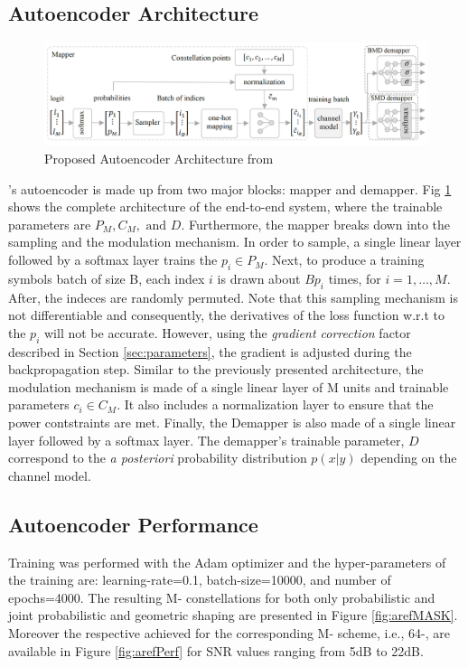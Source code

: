 \subsection{Autoencoder Architecture}
\begin{figure}[H]
	\centering
	\includegraphics[width=\textwidth]{figs/aref_diagram.png}
	\caption{Proposed Autoencoder Architecture from \cite{Aref}}
	\label{fig:arefAe}
\end{figure}

\citeauthor{Aref}'s autoencoder is made up from two major blocks: mapper and demapper. Fig \ref{fig:arefAe} shows the complete architecture of the end-to-end system, where the trainable parameters are $P_M, C_M, \text{ and } D$. Furthermore, the mapper breaks down into the sampling and the modulation mechanism. In order to sample, a single linear layer followed by a softmax layer trains the $p_i \in P_M$. Next, to produce a training symbols batch of size B, each index $i$ is drawn about $Bp_i$ times, for $i = 1, \dots, M$. After, the indeces are randomly permuted. Note that this sampling mechanism is not differentiable and consequently, the derivatives of the loss function w.r.t to the $p_i$ will not be accurate. However, using the \textit{gradient correction} factor described in Section \ref{sec:parameters}, the gradient is adjusted during the backpropagation step. Similar to the previously presented architecture, the modulation mechanism is made of a single linear layer of M units and trainable parameters $c_i \in C_M$. It also includes a normalization layer to ensure that the power contstraints are met. Finally, the Demapper is also made of a single linear layer followed by a softmax layer. The demapper's trainable parameter, $D$ correspond to the \textit{a posteriori} probability distribution $p(x|y)$ depending on the channel model.

\subsection{Autoencoder Performance}
Training was performed with the Adam optimizer and the hyper-parameters of the training are: learning-rate=0.1, batch-size=10000, and number of epochs=4000.
The resulting M- constellations for both only probabilistic and joint probabilistic and geometric shaping are presented in Figure \ref{fig:arefMASK}. Moreover the respective achieved  for the corresponding M- scheme, i.e., 64-, are available in Figure \ref{fig:arefPerf} for SNR values ranging from 5dB to 22dB.

